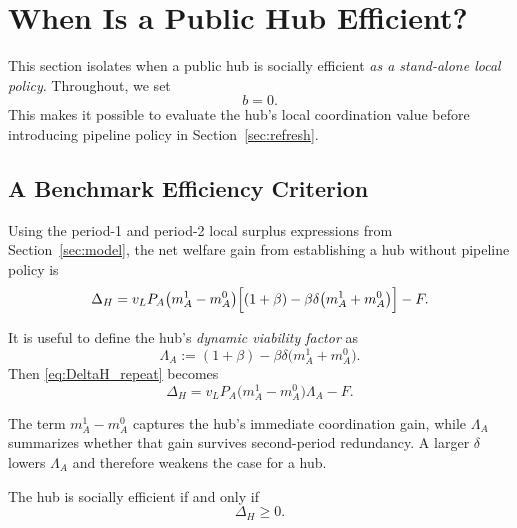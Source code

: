 \section{When Is a Public Hub Efficient?}
\label{sec:hub_efficiency}

This section isolates when a public hub is socially efficient \emph{as a stand-alone local policy}. Throughout, we set
\[
b=0.
\]
This makes it possible to evaluate the hub's local coordination value before introducing pipeline policy in Section~\ref{sec:refresh}.

\subsection{A Benchmark Efficiency Criterion}

Using the period-1 and period-2 local surplus expressions from Section~\ref{sec:model}, the net welfare gain from establishing a hub without pipeline policy is
\begin{equation}
\Delta_H
=
v_L P_A \bigl(m_A^1-m_A^0\bigr)
\Bigl[(1+\beta)-\beta\delta\bigl(m_A^1+m_A^0\bigr)\Bigr]
-F.
\label{eq:DeltaH_repeat}
\end{equation}

It is useful to define the hub's \emph{dynamic viability factor} as
\begin{equation}
\Lambda_A
:=
(1+\beta)-\beta\delta\bigl(m_A^1+m_A^0\bigr).
\label{eq:Lambda_def}
\end{equation}
Then \eqref{eq:DeltaH_repeat} becomes
\begin{equation}
\Delta_H
=
v_L P_A \bigl(m_A^1-m_A^0\bigr)\Lambda_A - F.
\label{eq:DeltaH_Lambda}
\end{equation}

The term $m_A^1-m_A^0$ captures the hub's immediate coordination gain, while $\Lambda_A$ summarizes whether that gain survives second-period redundancy. A larger $\delta$ lowers $\Lambda_A$ and therefore weakens the case for a hub.

The hub is socially efficient if and only if
\[
\Delta_H \ge 0.
\]

